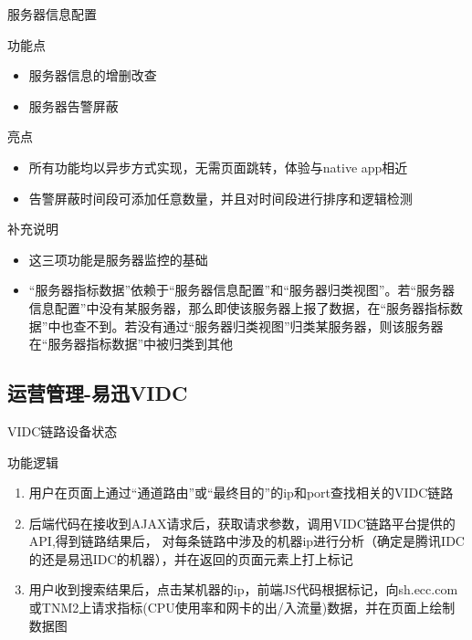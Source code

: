 \documentclass[CJK]{beamer}
\begin{document}
\begin{CJK*}{UTF8}{gbsn}
\begin{frame}{服务器信息配置}
	\begin{block}{功能点}
	\begin{itemize}
	\item 服务器信息的增删改查
	\item 服务器告警屏蔽
	\end{itemize}
	\end{block}
	
	\begin{block}{亮点}
	\begin{itemize}
	\item 所有功能均以异步方式实现，无需页面跳转，体验与native app相近
	\item 告警屏蔽时间段可添加任意数量，并且对时间段进行排序和逻辑检测
	\end{itemize}
	\end{block}
\end{frame}

\begin{frame}{补充说明}
	\begin{itemize}
	\item 这三项功能是服务器监控的基础
	\item “服务器指标数据”依赖于“服务器信息配置”和“服务器归类视图”。若“服务器信息配置”中没有某服务器，那么即使该服务器上报了数据，在“服务器指标数据”中也查不到。若没有通过“服务器归类视图”归类某服务器，则该服务器在“服务器指标数据”中被归类到其他
	\end{itemize}
\end{frame}

\subsection{运营管理-易迅VIDC}

\begin{frame}{VIDC链路设备状态}
	\begin{block}{功能逻辑}
	\begin{enumerate}
	\item 用户在页面上通过“通道路由”或“最终目的”的ip和port查找相关的VIDC链路
	\item 后端代码在接收到AJAX请求后，获取请求参数，调用VIDC链路平台提供的API,得到链路结果后，
	对每条链路中涉及的机器ip进行分析（确定是腾讯IDC的还是易迅IDC的机器），并在返回的页面元素上打上标记
	\item 用户收到搜索结果后，点击某机器的ip，前端JS代码根据标记，向sh.ecc.com或TNM2上请求指标(CPU使用率和网卡的出/入流量)数据，并在页面上绘制数据图
	\end{enumerate}
	\end{block}
\end{frame}


\end{CJK*}
\end{document}
